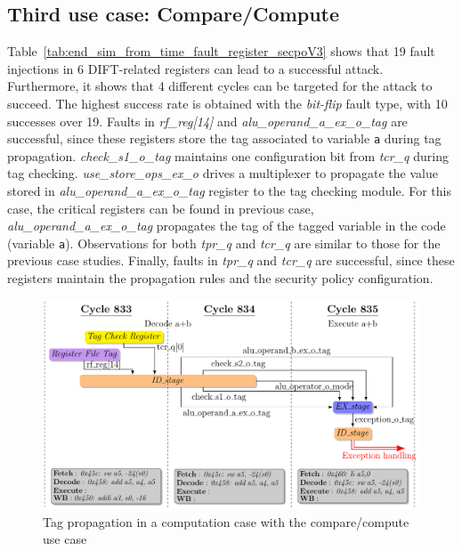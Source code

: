 \subsection{Third use case: Compare/Compute}
Table~\ref{tab:end_sim_from_time_fault_register_secpoV3} shows that 19 fault injections in 6 DIFT-related registers can lead to a successful attack. Furthermore, it shows that 4 different cycles can be targeted for the attack to succeed. The highest success rate is obtained with the \textit{bit-flip} fault type, with 10 successes over 19. 
Faults in \textit{rf\_reg[14]} and \textit{alu\_operand\_a\_ex\_o\_tag} are successful, since these registers store the tag associated to variable \verb|a| during tag propagation. \textit{check\_s1\_o\_tag} maintains one configuration bit from \textit{tcr\_q} during tag checking.
\textit{use\_store\_ops\_ex\_o} drives a multiplexer to propagate the value stored in \textit{alu\_operand\_a\_ex\_o\_tag} register to the tag checking module. 
For this case, the critical registers can be found in previous case, \textit{alu\_operand\_a\_ex\_o\_tag} propagates the tag of the tagged variable in the code (variable \verb|a|). 
Observations for both \textit{tpr\_q} and \textit{tcr\_q} are similar to those for the previous case studies. 
Finally, faults in \textit{tpr\_q} and \textit{tcr\_q} are successful, since these registers maintain the propagation rules and the security policy configuration.

\begin{figure}[ht]
    \centering
    \includegraphics[width=\linewidth]{c3_vulnerabilities_assessment/img/comp_compu/attaquePropag_v3_short.pdf}
    \caption{Tag propagation in a computation case with the compare/compute use case}
    \label{fig:study_attack_propag_v3_tag_propagation}
\end{figure}

